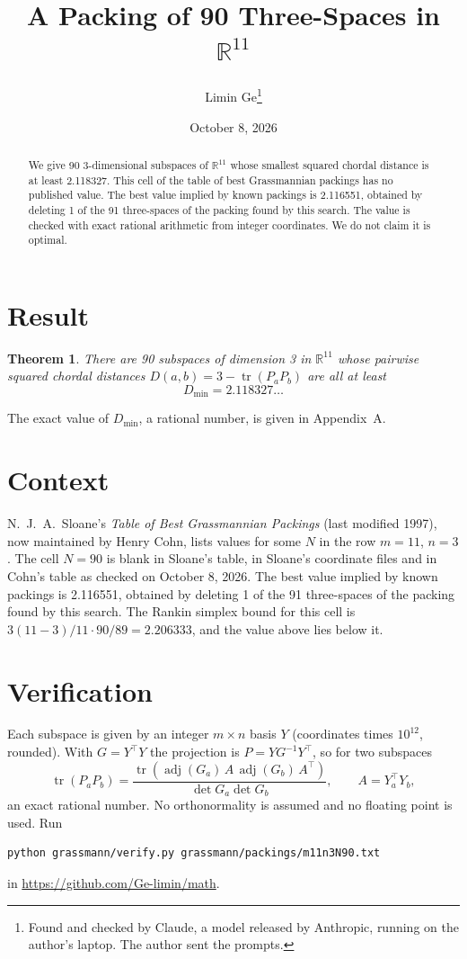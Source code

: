 \documentclass[11pt,a4paper]{article}
\title{A Packing of 90 Three-Spaces in $\mathbb{R}^{11}$}
\author{Limin Ge\thanks{Found and checked by Claude, a model released by Anthropic, running on the author's laptop. The author sent the prompts.}}
\date{October 8, 2026}
\newtheorem*{theorem}{Theorem}
\begin{document}
\maketitle
\begin{abstract}
We give 90 3-dimensional subspaces of $\mathbb{R}^{11}$ whose smallest squared chordal distance is at least 2.118327. This cell of the table of best Grassmannian packings has no published value. The best value implied by known packings is 2.116551, obtained by deleting 1 of the 91 three-spaces of the packing found by this search. The value is checked with exact rational arithmetic from integer coordinates. We do not claim it is optimal.
\end{abstract}

\section{Result}
\begin{theorem}
There are 90 subspaces of dimension 3 in $\mathbb{R}^{11}$ whose pairwise squared chordal distances $D(a,b) = 3 - \operatorname{tr}(P_aP_b)$ are all at least
\[ D_{\min} = 2.118327\ldots \]
\end{theorem}
The exact value of $D_{\min}$, a rational number, is given in Appendix~A.


\section{Context}
N.~J.~A.~Sloane's \emph{Table of Best Grassmannian Packings} (last modified 1997), now maintained by Henry Cohn, lists values for some $N$ in the row $m=11$, $n=3$. The cell $N=90$ is blank in Sloane's table, in Sloane's coordinate files and in Cohn's table as checked on October 8, 2026. The best value implied by known packings is 2.116551, obtained by deleting 1 of the 91 three-spaces of the packing found by this search. The Rankin simplex bound for this cell is $3(11-3)/11\cdot 90/89 = 2.206333$, and the value above lies below it.


\section{Verification}
Each subspace is given by an integer $m\times n$ basis $Y$ (coordinates times $10^{12}$, rounded). With $G=Y^\top Y$ the projection is $P=YG^{-1}Y^\top$, so for two subspaces
\[ \operatorname{tr}(P_aP_b)=\frac{\operatorname{tr}(\operatorname{adj}(G_a)\,A\,\operatorname{adj}(G_b)\,A^\top)}{\det G_a\det G_b},\qquad A=Y_a^\top Y_b, \]
an exact rational number. No orthonormality is assumed and no floating point is used. Run
\begin{verbatim}
python grassmann/verify.py grassmann/packings/m11n3N90.txt
\end{verbatim}
in \url{https://github.com/Ge-limin/math}.
\end{document}
